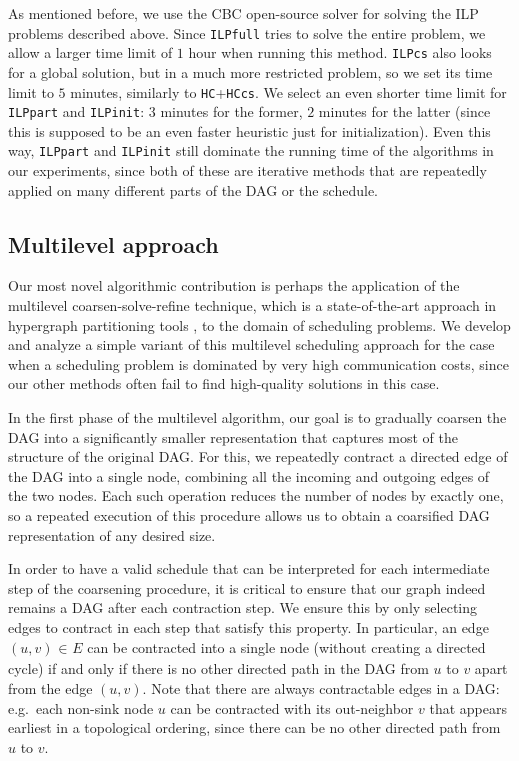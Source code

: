 \documentclass[sigconf,nonacm]{acmart}
\begin{document}
As mentioned before, we use the CBC open-source solver \cite{cbc1} for solving the ILP problems described above. Since \texttt{ILPfull} tries to solve the entire problem, we allow a larger time limit of $1$ hour when running this method. \texttt{ILPcs} also looks for a global solution, but in a much more restricted problem, so we set its time limit to $5$ minutes, similarly to \texttt{HC}+\texttt{HCcs}. We select an even shorter time limit for \texttt{ILPpart} and \texttt{ILPinit}: $3$ minutes for the former, $2$ minutes for the latter (since this is supposed to be an even faster heuristic just for initialization). Even this way, \texttt{ILPpart} and \texttt{ILPinit} still dominate the running time of the algorithms in our experiments, since both of these are iterative methods that are repeatedly applied on many different parts of the DAG or the schedule.

\subsection{Multilevel approach}

Our most novel algorithmic contribution is perhaps the application of the multilevel coarsen-solve-refine technique, which is a state-of-the-art approach in hypergraph partitioning tools \cite{multi1, multi2, multi3, DAH}, to the domain of scheduling problems. We develop and analyze a simple variant of this multilevel scheduling approach for the case when a scheduling problem is dominated by very high communication costs, since our other methods often fail to find high-quality solutions in this case.

In the first phase of the multilevel algorithm, our goal is to gradually coarsen the DAG into a significantly smaller representation that captures most of the structure of the original DAG. For this, we repeatedly contract a directed edge of the DAG into a single node, combining all the incoming and outgoing edges of the two nodes. Each such operation reduces the number of nodes by exactly one, so a repeated execution of this procedure allows us to obtain a coarsified DAG representation of any desired size.

In order to have a valid schedule that can be interpreted for each intermediate step of the coarsening procedure, it is critical to ensure that our graph indeed remains a DAG after each contraction step. We ensure this by only selecting edges to contract in each step that satisfy this property. In particular, an edge $(u,v) _{\!} \in _{\!} E$ can be contracted into a single node (without creating a directed cycle) if and only if there is no other directed path in the DAG from $u$ to $v$ apart from the edge $(u,v)$. Note that there are always contractable edges in a DAG: e.g.\ each non-sink node $u$ can be contracted with its out-neighbor $v$ that appears earliest in a topological ordering, since there can be no other directed path from $u$ to $v$.
\end{document}
